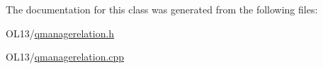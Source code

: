 The documentation for this class was generated from the following files\+:\begin{DoxyCompactItemize}
\item 
O\+L13/\hyperlink{qmanagerelation_8h}{qmanagerelation.\+h}\item 
O\+L13/\hyperlink{qmanagerelation_8cpp}{qmanagerelation.\+cpp}\end{DoxyCompactItemize}
